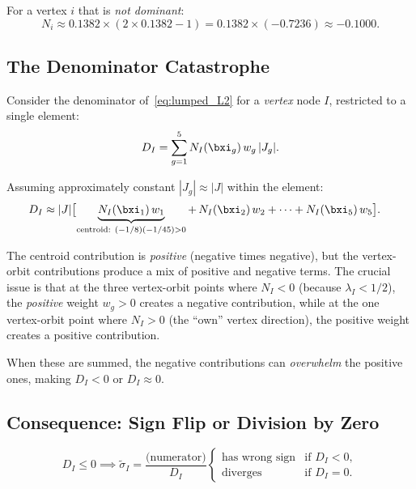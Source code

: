 For a vertex $i$ that is \emph{not dominant}:
\[
  N_i \approx 0.1382 \times (2 \times 0.1382 - 1) = 0.1382 \times (-0.7236)
      \approx -0.1000.
\]


\subsection{The Denominator Catastrophe}

Consider the denominator of~\eqref{eq:lumped_L2} for a \emph{vertex} node $I$,
restricted to a single element:
\begin{equation}
  D_I = \sum_{g=1}^{5} N_I(\bxi_g)\, w_g\, |J_g|.
  \label{eq:denominator_element}
\end{equation}

Assuming approximately constant $|J_g| \approx |J|$ within the element:
\begin{align}
  D_I &\approx |J| \bigl[
    \underbrace{N_I(\bxi_1)\,w_1}_{\text{centroid: } (-1/8)(-1/45) > 0}
    +\, N_I(\bxi_2)\,w_2
    + \cdots
    + N_I(\bxi_5)\,w_5
  \bigr].
  \label{eq:D_I_expansion}
\end{align}

The centroid contribution is \emph{positive} (negative times negative), but the
vertex-orbit contributions produce a mix of positive and negative terms.  The
crucial issue is that at the three vertex-orbit points where $N_I < 0$
(because $\lambda_I < 1/2$), the \emph{positive} weight $w_g > 0$ creates a
negative contribution, while at the one vertex-orbit point where $N_I > 0$
(the ``own'' vertex direction), the positive weight creates a positive
contribution.

When these are summed, the negative contributions can \emph{overwhelm} the
positive ones, making $D_I < 0$ or $D_I \approx 0$.


\subsection{Consequence: Sign Flip or Division by Zero}

\begin{equation}
  D_I \le 0 \implies \tilde{\sigma}_I
  = \frac{\text{(numerator)}}{D_I}
  \begin{cases}
    \text{has wrong sign}  & \text{if } D_I < 0, \\
    \text{diverges}        & \text{if } D_I = 0.
  \end{cases}
  \label{eq:sign_flip}
\end{equation}

